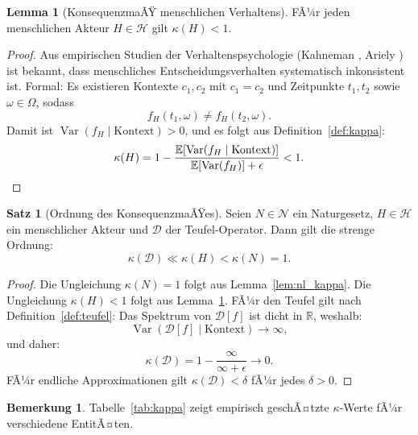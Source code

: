 ﻿\documentclass[a4paper,12pt]{article}
\DeclareMathOperator{\Var}{Var}
\theoremstyle{definition}
\newtheorem{satz}{Satz}
\newtheorem{lemma}{Lemma}
\newtheorem{bemerkung}{Bemerkung}
\begin{document}
\begin{lemma}[KonsequenzmaÃŸ menschlichen Verhaltens]
\label{lem:human_kappa}
FÃ¼r jeden menschlichen Akteur $H \in \mathcal{H}$ gilt $\kappa(H) < 1$.
\end{lemma}

\begin{proof}
Aus empirischen Studien der Verhaltenspsychologie (Kahneman \cite{kahneman2011}, Ariely \cite{ariely2008}) ist bekannt, dass menschliches Entscheidungsverhalten systematisch inkonsistent ist. Formal: Es existieren Kontexte $c_1, c_2$ mit $c_1 = c_2$ und Zeitpunkte $t_1, t_2$ sowie $\omega \in \Omega$, sodass
\[
f_H(t_1, \omega) \neq f_H(t_2, \omega).
\]
Damit ist $\Var(f_H \mid \text{Kontext}) > 0$, und es folgt aus Definition~\ref{def:kappa}:
\[
\kappa(H) = 1 - \frac{\mathbb{E}[\Var(f_H \mid \text{Kontext})]}{\mathbb{E}[\Var(f_H)] + \epsilon} < 1. \qedhere
\]
\end{proof}

\begin{satz}[Ordnung des KonsequenzmaÃŸes]
\label{satz:ordnung}
Seien $N \in \mathcal{N}$ ein Naturgesetz, $H \in \mathcal{H}$ ein menschlicher Akteur und $\mathcal{D}$ der Teufel-Operator. Dann gilt die strenge Ordnung:
\[
\kappa(\mathcal{D}) \ll \kappa(H) < \kappa(N) = 1.
\]
\end{satz}

\begin{proof}
Die Ungleichung $\kappa(N) = 1$ folgt aus Lemma~\ref{lem:nl_kappa}. Die Ungleichung $\kappa(H) < 1$ folgt aus Lemma~\ref{lem:human_kappa}. FÃ¼r den Teufel gilt nach Definition~\ref{def:teufel}: Das Spektrum von $\mathcal{D}[f]$ ist dicht in $\mathbb{R}$, weshalb:
\[
\Var(\mathcal{D}[f] \mid \text{Kontext}) \to \infty,
\]
und daher:
\[
\kappa(\mathcal{D}) = 1 - \frac{\infty}{\infty + \epsilon} \to 0.
\]
FÃ¼r endliche Approximationen gilt $\kappa(\mathcal{D}) < \delta$ fÃ¼r jedes $\delta > 0$. \qedhere
\end{proof}

\begin{bemerkung}
Tabelle~\ref{tab:kappa} zeigt empirisch geschÃ¤tzte $\kappa$-Werte fÃ¼r verschiedene EntitÃ¤ten.
\end{bemerkung}
\end{document}
